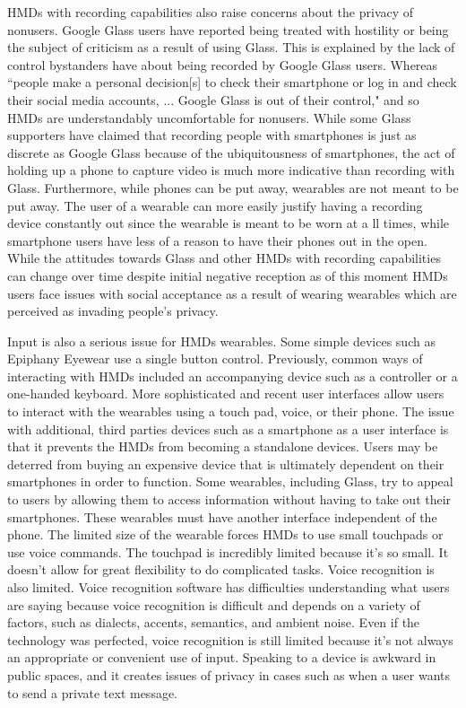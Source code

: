 \documentclass[11pt]{article}
\begin{document}
HMDs with recording capabilities also raise concerns about the privacy of nonusers. Google Glass users have reported being treated with hostility or being the subject of criticism as a result of using Glass\cite{fromCyborgsToGG}\cite{negativeGlassReactions}. This is explained by the lack of control bystanders have about being recorded by Google Glass users. Whereas ``people make a personal decision[s] to check their smartphone or log in and check their social media accounts, ... Google Glass is out of their control," and so HMDs are understandably uncomfortable for nonusers. While some Glass supporters have claimed that recording people with smartphones is just as discrete as Google Glass because of the ubiquitousness of smartphones, the act of holding up a phone to capture video is much more indicative than recording with Glass. Furthermore, while phones can be put away, wearables are not meant to be put away. The user of a wearable can more easily justify having a recording device constantly out since the wearable is meant to be worn at a ll times, while smartphone users have less of a reason to have their phones out in the open. While the attitudes towards Glass and other HMDs with recording capabilities can change over time despite initial negative reception\cite{changingAttitudes} as of this moment HMDs users face issues with social acceptance as a result of wearing wearables which are perceived as invading people's privacy.

Input is also a serious issue for HMDs wearables. Some simple devices such as Epiphany Eyewear use a single button control. Previously, common ways of interacting with HMDs included an accompanying device such as a controller or a one-handed keyboard\cite{inputForHDMs}. More sophisticated and recent user interfaces allow users to interact with the wearables using a  touch pad, voice, or their phone\cite{inputForHDMs}\cite{glassHelp}\cite{userInteractionMultipleDisplays}. The issue with additional, third parties devices such as a smartphone as a user interface is that it prevents the HMDs from becoming a standalone devices. Users may be deterred from buying an expensive device that is ultimately dependent on their smartphones in order to function. Some wearables, including Glass, try to appeal to users by allowing them to access information without having to take out their smartphones. These wearables must have another interface independent of the phone. The limited size of the wearable forces HMDs to use small touchpads or use voice commands. The touchpad is incredibly limited because it's so small. It doesn't allow for great flexibility to do complicated tasks. Voice recognition is also limited. Voice recognition software has difficulties understanding what users are saying because voice recognition is difficult and depends on a variety of factors, such as dialects, accents, semantics, and ambient noise\cite{voiceRecognitionTroubles}. Even if the technology was perfected, voice recognition is still limited because it's not always an appropriate or convenient use of input. Speaking to a device is awkward in public spaces, and it creates issues of privacy in cases such as when a user wants to send a private text message.
\end{document}
